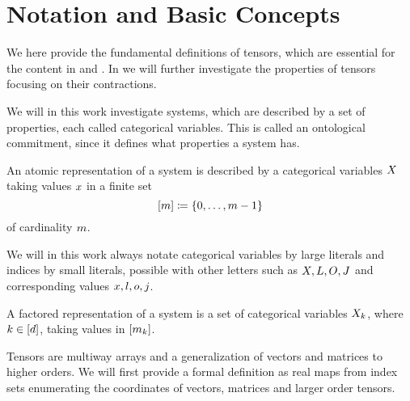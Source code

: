 \chapter{Notation and Basic Concepts}\label{cha:TensorNetworks}\label{cha:notation}

We here provide the fundamental definitions of tensors, which are essential for the content in  and .
In  we will further investigate the properties of tensors focusing on their contractions.

\sect{\bncategoricals}

We will in this work investigate systems, which are described by a set of properties, each called categorical variables.
This is called an ontological commitment, since it defines what properties a system has.

\begin{definition}
	An atomic representation of a system is described by a categorical variables $X$ taking values $x$ in a finite set
		\[  [m]\coloneqq \{0,\ldots, m-1\} \]
	of cardinality $m$.
\end{definition}

We will in this work always notate categorical variables by large literals and indices by small literals, possible with other letters such as $X,L,O,J$ and corresponding values $x,l,o,j$.

\begin{definition}
	A factored representation of a system is a set of categorical variables $X_{k}$, where $k\in[d]$, taking values in $[m_{k}]$.
\end{definition}

\sect{\bntensors}

Tensors are multiway arrays and a generalization of vectors and matrices to higher orders.
We will first provide a formal definition as real maps from index sets enumerating the coordinates of vectors, matrices and larger order tensors.

